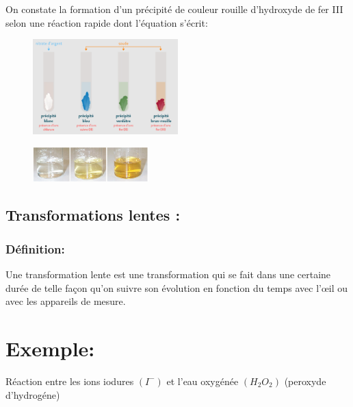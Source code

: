 \documentclass[12pt]{article}
\begin{document}
On constate la formation d'un précipité de couleur rouille d'hydroxyde de fer III selon une réaction rapide dont l'équation s'écrit: 

\begin{figure}[h!]
	\begin{center}
	\includegraphics[width=0.5\textwidth]{./img/TRLtestchimique.png}
\end{center}
\vspace{-1cm}
\end{figure}
\begin{figure}
	\vspace{-2.45cm}
	\includegraphics[width=0.4\textwidth]{./img/TRLidurelente.png}
\end{figure}


\subsection{Transformations lentes :}
\subsubsection{Définition: }
Une transformation lente est une transformation qui se fait dans une certaine durée de telle façon qu'on suivre son évolution en
fonction du temps avec l'œil ou avec les appareils de mesure.

\section*{Exemple: }
Réaction entre les ions iodures $(I^-)$ et l'eau oxygénée $(H_2O_2)$ (peroxyde d'hydrogéne)
\end{document}
